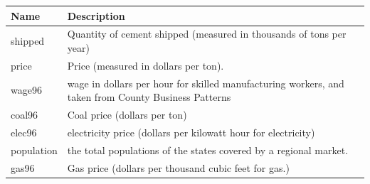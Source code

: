 \documentclass[]{book}
\begin{document}
\begin{longtable}[]{@{}ll@{}}
\toprule
\begin{minipage}[b]{0.05\columnwidth}\raggedright\strut
Name\strut
\end{minipage} & \begin{minipage}[b]{0.89\columnwidth}\raggedright\strut
Description\strut
\end{minipage}\tabularnewline
\midrule
\endhead
\begin{minipage}[t]{0.05\columnwidth}\raggedright\strut
shipped\strut
\end{minipage} & \begin{minipage}[t]{0.89\columnwidth}\raggedright\strut
Quantity of cement shipped (measured in thousands of tons per
year)\strut
\end{minipage}\tabularnewline
\begin{minipage}[t]{0.05\columnwidth}\raggedright\strut
price\strut
\end{minipage} & \begin{minipage}[t]{0.89\columnwidth}\raggedright\strut
Price (measured in dollars per ton).\strut
\end{minipage}\tabularnewline
\begin{minipage}[t]{0.05\columnwidth}\raggedright\strut
wage96\strut
\end{minipage} & \begin{minipage}[t]{0.89\columnwidth}\raggedright\strut
wage in dollars per hour for skilled manufacturing workers, and taken
from County Business Patterns\strut
\end{minipage}\tabularnewline
\begin{minipage}[t]{0.05\columnwidth}\raggedright\strut
coal96\strut
\end{minipage} & \begin{minipage}[t]{0.89\columnwidth}\raggedright\strut
Coal price (dollars per ton)\strut
\end{minipage}\tabularnewline
\begin{minipage}[t]{0.05\columnwidth}\raggedright\strut
elec96\strut
\end{minipage} & \begin{minipage}[t]{0.89\columnwidth}\raggedright\strut
electricity price (dollars per kilowatt hour for electricity)\strut
\end{minipage}\tabularnewline
\begin{minipage}[t]{0.05\columnwidth}\raggedright\strut
population\strut
\end{minipage} & \begin{minipage}[t]{0.89\columnwidth}\raggedright\strut
the total populations of the states covered by a regional market.\strut
\end{minipage}\tabularnewline
\begin{minipage}[t]{0.05\columnwidth}\raggedright\strut
gas96\strut
\end{minipage} & \begin{minipage}[t]{0.89\columnwidth}\raggedright\strut
Gas price (dollars per thousand cubic feet for gas.)\strut
\end{minipage}\tabularnewline
\bottomrule
\end{longtable}
\end{document}
